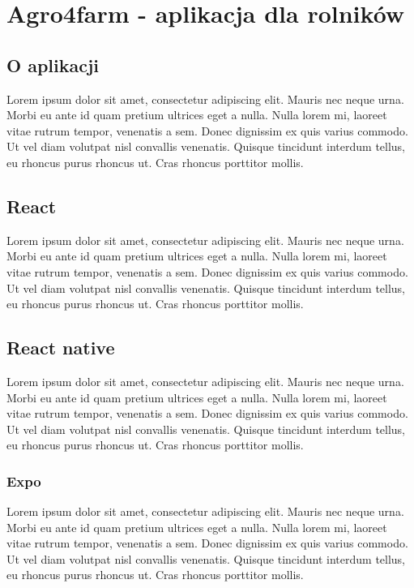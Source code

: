 \documentclass[a4paper,12pt,oneside]{book}
\begin{document}
	\newpage
	\chapter{Agro4farm - aplikacja dla rolników}
	
	\section{O aplikacji}
	Lorem ipsum dolor sit amet, consectetur adipiscing elit. Mauris nec neque urna. Morbi eu ante id quam pretium ultrices eget a nulla. Nulla lorem mi, laoreet vitae rutrum tempor, venenatis a sem. Donec dignissim ex quis varius commodo. Ut vel diam volutpat nisl convallis venenatis. Quisque tincidunt interdum tellus, eu rhoncus purus rhoncus ut. Cras rhoncus porttitor mollis.
	
	\section{React}
	Lorem ipsum dolor sit amet, consectetur adipiscing elit. Mauris nec neque urna. Morbi eu ante id quam pretium ultrices eget a nulla. Nulla lorem mi, laoreet vitae rutrum tempor, venenatis a sem. Donec dignissim ex quis varius commodo. Ut vel diam volutpat nisl convallis venenatis. Quisque tincidunt interdum tellus, eu rhoncus purus rhoncus ut. Cras rhoncus porttitor mollis.
	
	\section{React native}
	Lorem ipsum dolor sit amet, consectetur adipiscing elit. Mauris nec neque urna. Morbi eu ante id quam pretium ultrices eget a nulla. Nulla lorem mi, laoreet vitae rutrum tempor, venenatis a sem. Donec dignissim ex quis varius commodo. Ut vel diam volutpat nisl convallis venenatis. Quisque tincidunt interdum tellus, eu rhoncus purus rhoncus ut. Cras rhoncus porttitor mollis.
	
	\subsection{Expo}
	Lorem ipsum dolor sit amet, consectetur adipiscing elit. Mauris nec neque urna. Morbi eu ante id quam pretium ultrices eget a nulla. Nulla lorem mi, laoreet vitae rutrum tempor, venenatis a sem. Donec dignissim ex quis varius commodo. Ut vel diam volutpat nisl convallis venenatis. Quisque tincidunt interdum tellus, eu rhoncus purus rhoncus ut. Cras rhoncus porttitor mollis.
	
\end{document}
